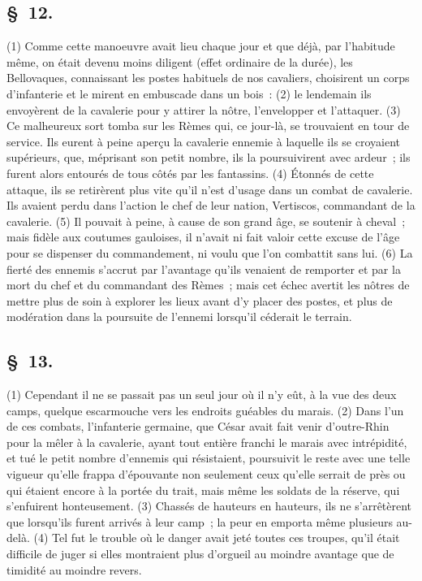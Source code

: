 \documentclass[french,twoside]{book} %
\begin{document}
\subsection[{§ 12.}]{ \textsc{§ 12.} }
\noindent (1) Comme cette manoeuvre avait lieu chaque jour et que déjà, par l’habitude même, on était devenu moins diligent (effet ordinaire de la durée), les Bellovaques, connaissant les postes habituels de nos cavaliers, choisirent un corps d’infanterie et le mirent en embuscade dans un bois : (2) le lendemain ils envoyèrent de la cavalerie pour y attirer la nôtre, l’envelopper et l’attaquer. (3) Ce malheureux sort tomba sur les Rèmes qui, ce jour-là, se trouvaient en tour de service. Ils eurent à peine aperçu la cavalerie ennemie à laquelle ils se croyaient supérieurs, que, méprisant son petit nombre, ils la poursuivirent avec ardeur ; ils furent alors entourés de tous côtés par les fantassins. (4) Étonnés de cette attaque, ils se retirèrent plus vite qu’il n’est d’usage dans un combat de cavalerie. Ils avaient perdu dans l’action le chef de leur nation, Vertiscos, commandant de la cavalerie. (5) Il pouvait à peine, à cause de son grand âge, se soutenir à cheval ; mais fidèle aux coutumes gauloises, il n’avait ni fait valoir cette excuse de l’âge pour se dispenser du commandement, ni voulu que l’on combattit sans lui. (6) La fierté des ennemis s’accrut par l’avantage qu’ils venaient de remporter et par la mort du chef et du commandant des Rèmes ; mais cet échec avertit les nôtres de mettre plus de soin à explorer les lieux avant d’y placer des postes, et plus de modération dans la poursuite de l’ennemi lorsqu’il céderait le terrain.
\subsection[{§ 13.}]{ \textsc{§ 13.} }
\noindent (1) Cependant il ne se passait pas un seul jour où il n’y eût, à la vue des deux camps, quelque escarmouche vers les endroits guéables du marais. (2) Dans l’un de ces combats, l’infanterie germaine, que César avait fait venir d’outre-Rhin pour la mêler à la cavalerie, ayant tout entière franchi le marais avec intrépidité, et tué le petit nombre d’ennemis qui résistaient, poursuivit le reste avec une telle vigueur qu’elle frappa d’épouvante non seulement ceux qu’elle serrait de près ou qui étaient encore à la portée du trait, mais même les soldats de la réserve, qui s’enfuirent honteusement. (3) Chassés de hauteurs en hauteurs, ils ne s’arrêtèrent que lorsqu’ils furent arrivés à leur camp ; la peur en emporta même plusieurs au-delà. (4) Tel fut le trouble où le danger avait jeté toutes ces troupes, qu’il était difficile de juger si elles montraient plus d’orgueil au moindre avantage que de timidité au moindre revers.
\end{document}
